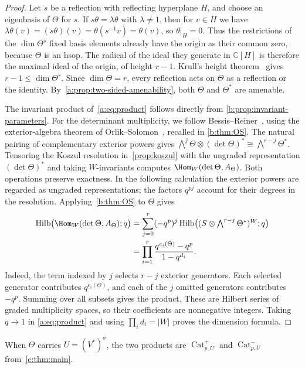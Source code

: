 \documentclass[10pt,a4paper]{amsart}
\DeclareMathOperator{\Cat}{Cat}
\theoremstyle{definition}
\newcommand{\C}{\mathbb C}\newcommand{\Q}{\mathbb Q}
\DeclareMathOperator{\Hilb}{Hilb}\DeclareMathOperator{\Res}{Res}
\begin{document}
\begin{proof}
Let $s$ be a reflection with reflecting hyperplane $H$, and choose
an eigenbasis of $\Theta$ for $s$. If $s\theta=\lambda\theta$
with $\lambda\ne1$, then for $v\in H$ we have
$\lambda\theta(v)=(s\theta)(v)=\theta(s^{-1}v)=\theta(v)$,
so $\theta|_H=0$. Thus the restrictions of the $\dim\Theta^s$ fixed
basis elements already have the origin as
their common zero, because $\Theta$ is an hsop. The radical of the
ideal they generate in $\C[H]$ is therefore the maximal ideal of the
origin, of height $r-1$. Krull's height
theorem~\cite[Lemma~10.60.12(1)]{Stacks} gives
$r-1\leq\dim\Theta^s$.
Since $\dim\Theta=r$, every reflection acts on $\Theta$ as a
reflection or the identity. By~\cref{a:prop:two-sided-amenability},
both $\Theta$ and $\Theta^*$ are amenable.

The invariant product of~\cref{a:eq:product} follows directly from
\cref{b:prop:invariant-parameters}.
For the determinant multiplicity, we follow
Bessis--Reiner~\cite[Proposition~4.2]{BR}, using the exterior-algebra
theorem of Orlik--Solomon~\cite[Theorem~3.1]{OS}, recalled in
\cref{b:thm:OS}.
The natural pairing of complementary exterior powers gives
$\bigwedge^j\Theta\otimes(\det\Theta)^*
\cong\bigwedge^{r-j}\Theta^*$.
Tensoring the Koszul resolution in~\cref{prop:koszul} with the ungraded
representation $(\det\Theta)^*$ and taking $W$-invariants computes
$\Hom_W(\det\Theta,A_\Theta)$. Both operations preserve exactness.
In the following calculation the exterior powers are regarded as
ungraded representations; the factors $q^{pj}$ account for their
degrees in the resolution. Applying~\cref{b:thm:OS} to $\Theta$ gives
\begin{align*}
 \Hilb\bigl(\Hom_W(\det\Theta,A_\Theta);q\bigr)
 &=\sum_{j=0}^r(-q^p)^j
   \Hilb\bigl((S\otimes\textstyle\bigwedge^{r-j}\Theta^*)^W;q\bigr)\\
 &=\prod_{i=1}^r\frac{q^{e_i(\Theta)}-q^p}{1-q^{d_i}}.
\end{align*}
Indeed, the term indexed by $j$ selects $r-j$ exterior generators.
Each selected generator contributes $q^{e_i(\Theta)}$, and each of
the $j$ omitted generators contributes $-q^p$. Summing over all
subsets gives the product.
These are Hilbert series of graded multiplicity spaces, so their
coefficients are nonnegative integers. Taking $q\to1$ in
\cref{a:eq:product} and using $\prod_i d_i=|W|$ proves the dimension
formula.
\end{proof}

When $\Theta$ carries $U=(V^*)^\sigma$, the two products are
$\Cat^+_{p,U}$ and $\Cat^-_{p,U}$ from~\cref{c:thm:main}.
\end{document}
